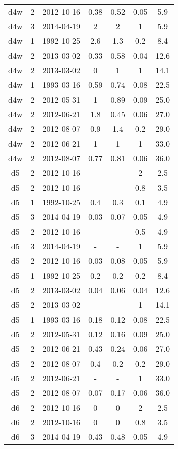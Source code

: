 \begin{table*}[htp]
\begin{tabular}{ccccccc}
d4w & 2 & 2012-10-16 & 0.38 & 0.52 & 0.05 & 5.9 \\
d4w & 3 & 2014-04-19 & 2 & 2 & 1 & 5.9 \\
d4w & 1 & 1992-10-25 & 2.6 & 1.3 & 0.2 & 8.4 \\
d4w & 2 & 2013-03-02 & 0.33 & 0.58 & 0.04 & 12.6 \\
d4w & 2 & 2013-03-02 & 0 & 1 & 1 & 14.1 \\
d4w & 1 & 1993-03-16 & 0.59 & 0.74 & 0.08 & 22.5 \\
d4w & 2 & 2012-05-31 & 1 & 0.89 & 0.09 & 25.0 \\
d4w & 2 & 2012-06-21 & 1.8 & 0.45 & 0.06 & 27.0 \\
d4w & 2 & 2012-08-07 & 0.9 & 1.4 & 0.2 & 29.0 \\
d4w & 2 & 2012-06-21 & 1 & 1 & 1 & 33.0 \\
d4w & 2 & 2012-08-07 & 0.77 & 0.81 & 0.06 & 36.0 \\
d5 & 2 & 2012-10-16 & - & - & 2 & 2.5 \\
d5 & 2 & 2012-10-16 & - & - & 0.8 & 3.5 \\
d5 & 1 & 1992-10-25 & 0.4 & 0.3 & 0.1 & 4.9 \\
d5 & 3 & 2014-04-19 & 0.03 & 0.07 & 0.05 & 4.9 \\
d5 & 2 & 2012-10-16 & - & - & 0.5 & 4.9 \\
d5 & 3 & 2014-04-19 & - & - & 1 & 5.9 \\
d5 & 2 & 2012-10-16 & 0.03 & 0.08 & 0.05 & 5.9 \\
d5 & 1 & 1992-10-25 & 0.2 & 0.2 & 0.2 & 8.4 \\
d5 & 2 & 2013-03-02 & 0.04 & 0.06 & 0.04 & 12.6 \\
d5 & 2 & 2013-03-02 & - & - & 1 & 14.1 \\
d5 & 1 & 1993-03-16 & 0.18 & 0.12 & 0.08 & 22.5 \\
d5 & 2 & 2012-05-31 & 0.12 & 0.16 & 0.09 & 25.0 \\
d5 & 2 & 2012-06-21 & 0.43 & 0.24 & 0.06 & 27.0 \\
d5 & 2 & 2012-08-07 & 0.4 & 0.2 & 0.2 & 29.0 \\
d5 & 2 & 2012-06-21 & - & - & 1 & 33.0 \\
d5 & 2 & 2012-08-07 & 0.07 & 0.17 & 0.06 & 36.0 \\
d6 & 2 & 2012-10-16 & 0 & 0 & 2 & 2.5 \\
d6 & 2 & 2012-10-16 & 0 & 0 & 0.8 & 3.5 \\
d6 & 3 & 2014-04-19 & 0.43 & 0.48 & 0.05 & 4.9 \\

\end{tabular}
\end{table*}
